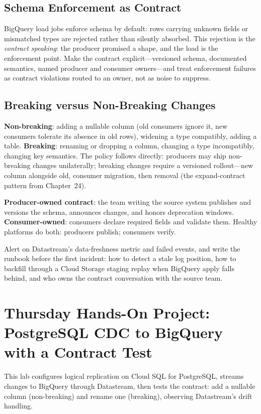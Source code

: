 \subsection{Schema Enforcement as Contract}
BigQuery load jobs enforce schema by default: rows carrying unknown fields or mismatched types are rejected rather than silently absorbed. This rejection is the \emph{contract speaking}: the producer promised a shape, and the load is the enforcement point. Make the contract explicit---versioned schema, documented semantics, named producer and consumer owners---and treat enforcement failures as contract violations routed to an owner, not as noise to suppress.

\subsection{Breaking versus Non-Breaking Changes}
\textbf{Non-breaking}: adding a nullable column (old consumers ignore it, new consumers tolerate its absence in old rows), widening a type compatibly, adding a table. \textbf{Breaking}: renaming or dropping a column, changing a type incompatibly, changing key semantics. The policy follows directly: producers may ship non-breaking changes unilaterally; breaking changes require a versioned rollout---new column alongside old, consumer migration, then removal (the expand-contract pattern from Chapter~24).

\begin{definitionbox}
\textbf{Producer-owned contract}: the team writing the source system publishes and versions the schema, announces changes, and honors deprecation windows. \textbf{Consumer-owned}: consumers declare required fields and validate them. Healthy platforms do both: producers publish; consumers verify.
\end{definitionbox}

\begin{tipbox}
Alert on Datastream's data-freshness metric and failed events, and write the runbook before the first incident: how to detect a stale log position, how to backfill through a Cloud Storage staging replay when BigQuery apply falls behind, and who owns the contract conversation with the source team.
\end{tipbox}

\section{Thursday Hands-On Project: PostgreSQL CDC to BigQuery with a Contract Test}
This lab configures logical replication on Cloud SQL for PostgreSQL, streams changes to BigQuery through Datastream, then tests the contract: add a nullable column (non-breaking) and rename one (breaking), observing Datastream's drift handling.

